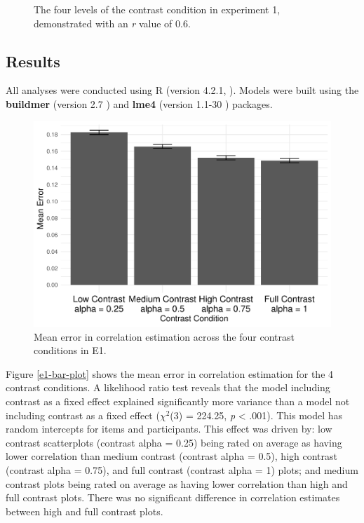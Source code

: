 \documentclass[preprint, 3p,
authoryear]{elsarticle} %
\begin{document}
\begin{figure}
\caption{\label{e1-example-plots}The four levels of the contrast condition in experiment 1, demonstrated with an \textit{r} value of 0.6.}\label{fig:e1-example-plots}
\end{figure}

\hypertarget{results}{%
\subsection{Results}\label{results}}

All analyses were conducted using R (version 4.2.1, \citep{r_core}).
Models were built using the \textbf{buildmer} (version 2.7
\citep{voeten_buildmer_2022}) and \textbf{lme4} (version 1.1-30
\citep{bates_lme4_2015}) packages.

\begin{figure}

\includegraphics[width=0.5\linewidth]{contrast_and_scatterplots_files/figure-latex/e1-bar-plot-1} \hfill{}

\caption{\label{e1-bar-plot}Mean error in correlation estimation across the four contrast conditions in E1.}\label{fig:e1-bar-plot}
\end{figure}

Figure \ref{e1-bar-plot} shows the mean error in correlation estimation
for the 4 contrast conditions. A likelihood ratio test reveals that the
model including contrast as a fixed effect explained significantly more
variance than a model not including contrast as a fixed effect
(\(\chi^2\)(3) = 224.25, \emph{p} \textless{} .001). This model has
random intercepts for items and participants. This effect was driven by:
low contrast scatterplots (contrast alpha = 0.25) being rated on average
as having lower correlation than medium contrast (contrast alpha = 0.5),
high contrast (contrast alpha = 0.75), and full contrast (contrast alpha
= 1) plots; and medium contrast plots being rated on average as having
lower correlation than high and full contrast plots. There was no
significant difference in correlation estimates between high and full
contrast plots.
\end{document}
